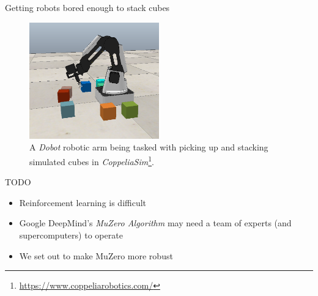\begin{frame}{Getting robots bored enough to stack cubes}
    \begin{figure}
        \centering
        \includegraphics[width=0.5\textwidth]{assets/cube_stacking.png}
        \caption{A \textit{Dobot} robotic arm being tasked with picking up and stacking simulated cubes in \textit{CoppeliaSim}\footnote{\url{https://www.coppeliarobotics.com/}}.}
        \label{fig:cube_stacking}
    \end{figure}
\end{frame}

\begin{frame}{TODO}
    \begin{itemize}
        \item Reinforcement learning is difficult
        \item Google DeepMind's \textit{MuZero Algorithm} \cite{muzero} may need a team of experts (and supercomputers) to operate
        \item We set out to make MuZero more robust
    \end{itemize}
\end{frame}
